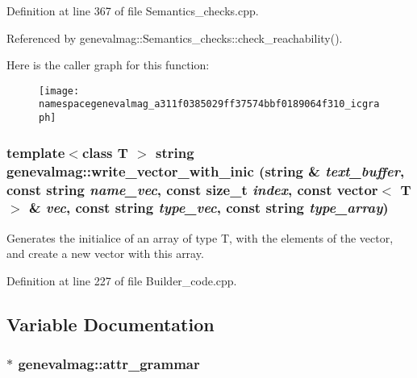 Definition at line 367 of file Semantics\_\-checks.cpp.



Referenced by genevalmag::Semantics\_\-checks::check\_\-reachability().



Here is the caller graph for this function:\nopagebreak
\begin{figure}[H]
\begin{center}
\leavevmode
\texttt{[image: namespacegenevalmag\_a311f0385029ff37574bbf0189064f310\_icgraph]}
\end{center}
\end{figure}


\hypertarget{namespacegenevalmag_af74af87309332e02ec5d55c14ab1fa97}{
\subsubsection[{write\_\-vector\_\-with\_\-inic}]{\setlength{\rightskip}{0pt plus 5cm}template$<$class T $>$ string genevalmag::write\_\-vector\_\-with\_\-inic (string \& {\em text\_\-buffer}, \/  const string {\em name\_\-vec}, \/  const size\_\-t {\em index}, \/  const vector$<$ T $>$ \& {\em vec}, \/  const string {\em type\_\-vec}, \/  const string {\em type\_\-array})}}
\label{namespacegenevalmag_af74af87309332e02ec5d55c14ab1fa97}
Generates the initialice of an array of type T, with the elements of the vector, and create a new vector with this array. 

Definition at line 227 of file Builder\_\-code.cpp.



\subsection{Variable Documentation}
\hypertarget{namespacegenevalmag_a85aabf29d2f206619e2d128154283336}{
\subsubsection[{attr\_\-grammar}]{$\ast$ {\bf genevalmag::attr\_\-grammar}}}
\label{namespacegenevalmag_a85aabf29d2f206619e2d128154283336}


